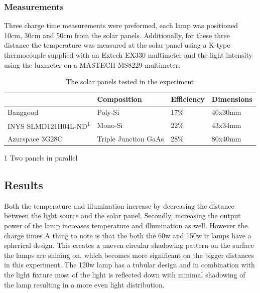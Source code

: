 \subsubsection{Measurements}
Three charge time measurements were preformed, each lamp was positioned 10cm, 30cm and 50cm from the solar panels.
Additionally, for these three distance the temperature was measured at the solar panel using a K-type thermocouple supplied with an Extech EX330 multimeter and the light intensity using the luxmeter on a MASTECH MS8229 multimeter.

\begin{table}[t]
	\centering
	\begin{threeparttable}
		\caption{The solar panels tested in the experiment}
		\label{tab:solar_panels}
		\small
		\begin{tabular}{|l|l|l|l|}
			\hline
			& Composition & Efficiency & Dimensions \\
			\hline \hline
			Banggood \cite{bangood_solar_2017}& Poly-Si & 17\% & 40x30mm \\
			INYS SLMD121H04L-ND\textsuperscript{1}& Mono-Si & 22\% & 43x34mm \\
			Azurspace 3G28C & Triple Junction GaAs& 28\% & 80x40mm \\
			\hline
		\end{tabular}
	\begin{tablenotes}
		\small
		\item [1] Two panels in parallel
	\end{tablenotes}
	\end{threeparttable}
\end{table}

\subsection{Results}

Both the temperature and illumination increase by decreasing the distance between the light source and the solar panel. 
Secondly, increasing the output power of the lamp increases temperature and illumination as well. 
However the charge times 
A thing to note is that the both the 60w and 150w ir lamps have a spherical design. This creates a uneven circular shadowing pattern on the surface the lamps are shining on, which becomes more significant on the bigger distances in this experiment.
The 120w lamp has a tubular design and in combination with the light fixture most of the light is reflected down with minimal shadowing of the lamp resulting in a more even light distribution.

